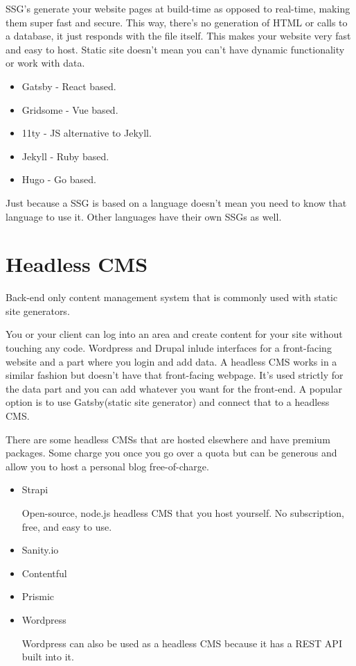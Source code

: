 SSG's generate your website pages at build-time as opposed to real-time, making them super fast and secure. This way, there's no generation of HTML or calls to a database, it just responds with the file itself. This makes your website very fast and easy to host. Static site doesn't mean you can't have dynamic functionality or work with data. 

\begin{itemize}
    \item Gatsby - React based.
    \item Gridsome - Vue based. 
    \item 11ty - JS alternative to Jekyll.
    \item Jekyll - Ruby based.
    \item Hugo - Go based. 
\end{itemize}
Just because a SSG is based on a language doesn't mean you need to know that language to use it. Other languages have their own SSGs as well.

\section{Headless CMS}
Back-end only content management system that is commonly used with static site generators. 

You or your client can log into an area and create content for your site without touching any code. Wordpress and Drupal inlude interfaces for a front-facing website and a part where you login and add data. A headless CMS works in a similar fashion but doesn't have that front-facing webpage. It's used strictly for the data part and you can add whatever you want for the front-end. A popular option is to use Gatsby(static site generator) and connect that to a headless CMS. 

There are some headless CMSs that are hosted elsewhere and have premium packages. Some charge you once you go over a quota but can be generous and allow you to host a personal blog free-of-charge. 
\begin{itemize}
    \item Strapi
    
    Open-source, node.js headless CMS that you host yourself. No subscription, free, and easy to use. 
    \item Sanity.io
    \item Contentful
    \item Prismic
    \item Wordpress
    
    Wordpress can also be used as a headless CMS because it has a REST API built into it.
\end{itemize}

